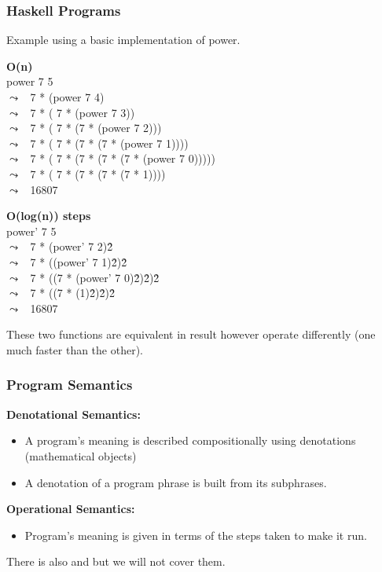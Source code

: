 \documentclass{report}
\begin{document}
\subsubsection*{Haskell Programs}
Example using a basic implementation of power.

\newcommand{\step}[1]{$\leadsto$ \ #1\\}

\begin{minipage}{.5\textwidth}
	\textbf{O(n)} \\
	power 7 5 \\
	\step{7 * (power 7 4)}
	\step{7 * ( 7 * (power 7 3))}
	\step{7 * ( 7 * (7 * (power 7 2)))}
	\step{7 * ( 7 * (7 * (7 * (power 7 1))))}
	\step{7 * ( 7 * (7 * (7 * (7 * (power 7 0)))))}
	\step{7 * ( 7 * (7 * (7 * (7 * 1))))}
	\step{16807}
\end{minipage} \begin{minipage}{.5\textwidth}
	\textbf{O(log(n)) steps} \\
	power' 7 5 \\
	\step{7 * (power' 7 2)\^2}
	\step{7 * ((power' 7 1)\^2)\^2}
	\step{7 * ((7 * (power' 7 0)\^2)\^2)\^2}
	\step{7 * ((7 * (1)\^2)\^2)\^2}
	\step{16807}
\end{minipage}

These two functions are equivalent in result however operate differently (one much faster than the other).

\subsubsection*{Program Semantics}
\textbf{Denotational Semantics:}
\begin{itemize}
	\item A program's meaning is described compositionally using denotations (mathematical objects)
	\item A denotation of a program phrase is built from its subphrases.
\end{itemize}
\textbf{Operational Semantics:}
\begin{itemize}
	\item Program's meaning is given in terms of the steps taken to make it run.
\end{itemize}
There is also  and  but we will not cover them.
\end{document}
